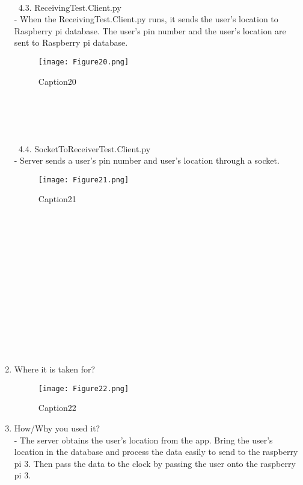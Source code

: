 \documentclass[10pt,a4paper,twocolumn]{report}
\begin{document}
\begin{enumerate}
\begin{figure}[h]
			\end{figure}
			\\\\\\\\\\\\\
			4.3. ReceivingTest.Client.py \\
			- When the ReceivingTest.Client.py runs, it sends the user’s location to Raspberry pi database. The user’s pin number and the user’s location are sent to Raspberry pi database. \\
			\begin{figure}[h]
				\texttt{[image: Figure20.png]}
				\caption{Caption20}
				\label{fig20}
			\end{figure}
			\\\\\\\\\
			4.4. SocketToReceiverTest.Client.py \\
			- Server sends a user’s pin number and user’s location through a socket. \\
			\begin{figure}[h]
				\texttt{[image: Figure21.png]}
				\caption{Caption21}
				\label{fig21}
			\end{figure}
			\\\\\\\\\\\\\\\\\\\\\\\
			\item Where it is taken for?  \\
			\begin{figure}[h]
				\texttt{[image: Figure22.png]}
				\caption{Caption22}
				\label{fig22}
			\end{figure}
			\item How/Why you used it? \\
			- The server obtains the user’s location from the app. Bring the user’s location in the database and process the data easily to send to the raspberry pi 3. Then pass the data to the clock by passing the user onto the raspberry pi 3. \\

\end{enumerate}
\end{document}
